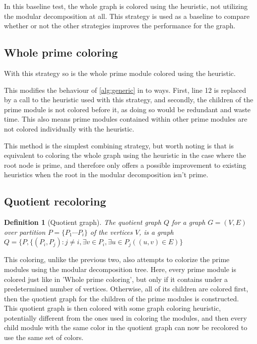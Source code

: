 \documentclass[a4paper]{article}
\newtheorem{definition}{Definition}[section]
\begin{document}
In this baseline test, the whole graph is colored using the heuristic, not
utilizing the modular decomposition at all. This strategy is used as a baseline
to compare whether or not the other strategies improves the performance for the
graph.

\subsection{Whole prime coloring}

With this strategy so is the whole prime module colored using the heuristic. 

This modifies the behaviour of \autoref{alg:generic} in to ways. First, line 12 is replaced by a
call to the heuristic used with this strategy, and secondly, the children of the prime
module is not colored before it, as doing so would be redundant and waste time.
This also means prime modules contained within other prime modules are not
colored individually with the heuristic.

This method is the simplest combining strategy, but worth noting is that is
equivalent to coloring the whole graph using the heuristic in the case where the
root node is prime, and therefore only offers a possible improvement to existing
heuristics when the root in the modular decomposition isn't prime.

\subsection{Quotient recoloring}

\begin{definition}[Quotient graph]
    The quotient graph $Q$ for a graph $G = (V,E)$ over partition 
    $P = \{P_1 \cdots P_i\}$  of the vertices $V$, is a graph 
    $Q = \{P, \{(P_i,P_j) : j\neq i, \exists v \in P_i,\exists u \in P_j( (u,v)
    \in E)   \}   $
\end{definition}

This coloring, unlike the previous two, also attempts to colorize the prime
modules using the modular decomposition tree. Here, every prime module is
colored just like in 'Whole prime coloring', but only if it contains under a
predetermined number of vertices.  Otherwise, all of its children are colored
first, then the quotient graph for the children of the prime modules is
constructed. This quotient graph is then colored with some graph coloring
heuristic, potentially different from the ones used in coloring the modules,
and then every child module with the same color in the quotient graph can now
be recolored to use the same set of colors.
\end{document}
